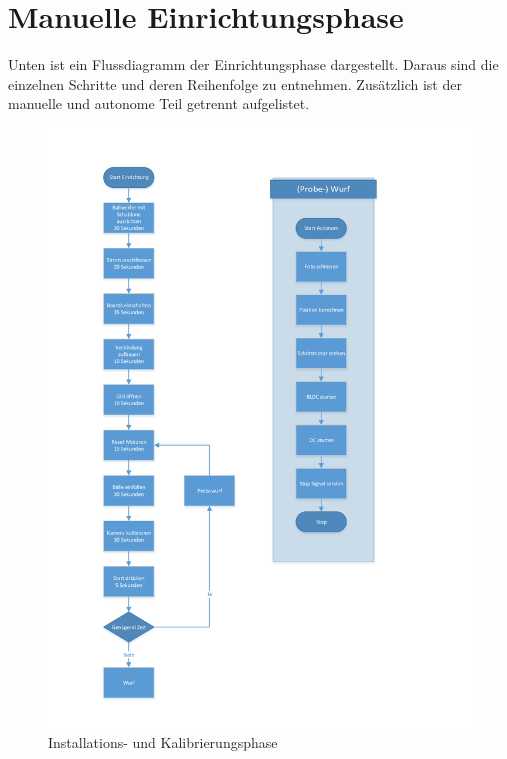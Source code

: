 \section{Manuelle Einrichtungsphase}
Unten ist ein Flussdiagramm der Einrichtungsphase dargestellt. Daraus sind die einzelnen Schritte und deren Reihenfolge zu entnehmen. Zusätzlich ist der manuelle und autonome Teil getrennt aufgelistet.

\begin{figure}[h!]
\centering
\includegraphics[width=0.7\linewidth]{../../fig/ablauf-ballwurf}
\caption{Installations- und Kalibrierungsphase}
\label{fig:ablauf-ballwurf}
\end{figure}

